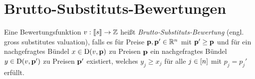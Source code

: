 \section{Brutto-Substituts-Bewertungen}


\iffalse
\begin{definition}[Diskret-Konkave Funktion]
	Eine Funktion $v: \ffirst{\fs}^n \rightarrow \Z$ heißt \emph{diskret-konkav}, falls lokale Minima auch global minimal sind, also falls für alle Preise $\fp\in\R^n$ und Bündel $x\in\ffirst{\fs}^n$ mit \begin{align*}
	&v(x) \geq \max_{i : x_i>0} v(x - e_i) + p_i, \qquad
	&v(x) \geq \max_{j:x_j < s_j} v(x + e_j) - p_j, \\
	&v(x) \geq \max_{\substack{i: x_i>0 \\ j: x_j < s_j}} v(x + e_i - e_j) - p_i + p-j
	\end{align*}
	bereits $x\in\NB(v, \fp)$ gilt.
\end{definition}
\fi

\begin{definition}
Eine Bewertungsfunktion $v: \left\llbracket s \right\rrbracket \rightarrow \mathbb{Z}$ heißt \emph{Brutto-Substituts-Bewertung} (engl. gross substitutes valuation), falls es für Preise $\mathbf{p},\mathbf{p}' \in\mathbb{R}^n$ mit $\mathbf{p}' \geq \mathbf{p}$ und für ein nachgefragtes Bündel $x\in\NB(v, \fp)$ zu Preisen $\mathbf{p}$ ein nachgefragtes Bündel $y\in\operatorname{D}(v,\mathbf{p}')$ zu Preisen $\mathbf{p}'$ existiert, welches $y_j \geq x_j$ für alle $j\in\left[ n \right]$ mit $p_j = p_j'$ erfüllt.
\end{definition}

